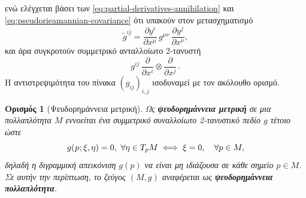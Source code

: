 \documentclass[11pt,a4paper,twoside,openright]{book}
\newtheorem{definition}[lemma]{Ορισμός}
\begin{document}
ενώ ελέγχεται βάσει των \eqref{eq:partial-derivatives-annihilation}
και \eqref{eq:pseudorieamannian-covariance}
ότι υπακούν στον μετασχηματισμό
\begin{equation}\label{eq:pseudorieamannian-contravariance}
\tilde{g}^{ij} = \frac{\partial y^i}{\partial x^\mu}\,g^{\mu \nu}\,\frac{\partial y^j}{\partial x^\nu},
\end{equation}
και άρα συγκροτούν συμμετρικό ανταλλοίωτο 2-τανυστή
\begin{equation}\label{eq:inverse-pseudoriemannian}
g^{ij}\,\frac{\partial}{\partial x^i} \otimes \frac{\partial}{\partial x^j}\,.
\end{equation}
Η αντιστρεψιμότητα του πίνακα $(g_{ij})_{i,j}$ ισοδυναμεί με τον ακόλουθο ορισμό.
\begin{definition}[Ψευδορημάννεια μετρική]\label{def:pseudo-riemannian-metrics}
Ως \textbf{ψευδορημάννεια μετρική} σε μια πολλαπλότητα $Μ$ εννοείται
ένα συμμετρικό συναλλοίωτο 2-τανυστικό πεδίο $g$ τέτοιο ώστε
\begin{equation}\label{eq:definition-pseudoriemannian-metric}
g(\hspace{.5pt}p\hspace{.5pt}; \xi, \eta) = 0,
\,\,
\forall \eta \in T_pM
\iff
\xi = 0,
\quad
\forall p \in M,
\end{equation}
δηλαδή η διγραμμική απεικόνιση
$g(p)$ να είναι μη ιδιάζουσα
σε κάθε σημείο $p \in M$.
Σε αυτήν την περίπτωση, το ζεύγος $(Μ, g)$ αναφέρεται ως \textbf{ψευδορημάννεια πολλαπλότητα}.
\end{definition}
\end{document}
